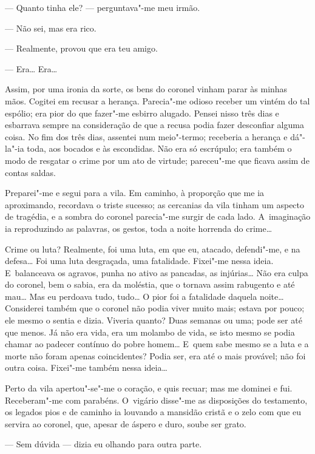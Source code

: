 \begin{linenumbers}
--- Quanto tinha ele? --- perguntava"-me meu irmão.

--- Não sei, mas era rico.

--- Realmente, provou que era teu amigo.

--- Era\ldots{} Era\ldots{}

Assim, por uma ironia da sorte, os bens do coronel vinham parar às
minhas mãos. Cogitei em recusar a herança. Parecia"-me odioso receber um
vintém do tal espólio; era pior do que fazer"-me esbirro alugado. Pensei
nisso três dias e esbarrava sempre na consideração de que a recusa podia
fazer desconfiar alguma coisa. No fim dos três dias, assentei num
meio"-termo; receberia a herança e dá"-la"-ia toda, aos bocados e às
escondidas. Não era só escrúpulo; era também o modo de resgatar o crime
por um ato de virtude; pareceu"-me que ficava assim de contas saldas.

Preparei"-me e segui para a vila. Em caminho, à proporção que me ia
aproximando, recordava o triste sucesso; as cercanias da vila tinham um
aspecto de tragédia, e a sombra do coronel parecia"-me surgir de cada
lado. A~imaginação ia reproduzindo as palavras, os gestos, toda a noite
horrenda do crime\ldots{}

Crime ou luta? Realmente, foi uma luta, em que eu, atacado, defendi"-me,
e na defesa\ldots{} Foi uma luta desgraçada, uma fatalidade. Fixei"-me nessa
ideia. E~balanceava os agravos, punha no ativo as pancadas, as
injúrias\ldots{} Não era culpa do coronel, bem o sabia, era da moléstia, que
o tornava assim rabugento e até mau\ldots{} Mas eu perdoava tudo, tudo\ldots{} O
pior foi a fatalidade daquela noite\ldots{} Considerei também que o coronel
não podia viver muito mais; estava por pouco; ele mesmo o sentia e
dizia. Viveria quanto? Duas semanas ou uma; pode ser até que menos. Já
não era vida, era um molambo de vida, se isto mesmo se podia chamar ao
padecer contínuo do pobre homem\ldots{} E~quem sabe mesmo se a luta e a morte
não foram apenas coincidentes? Podia ser, era até o mais provável; não
foi outra coisa. Fixei"-me também nessa ideia\ldots{}

Perto da vila apertou"-se"-me o coração, e quis recuar; mas me dominei e
fui. Receberam"-me com parabéns. O~vigário disse"-me as disposições do
testamento, os legados pios e de caminho ia louvando a mansidão cristã e
o zelo com que eu servira ao coronel, que, apesar de áspero e duro,
soube ser grato.

--- Sem dúvida --- dizia eu olhando para outra parte.


\end{linenumbers}
